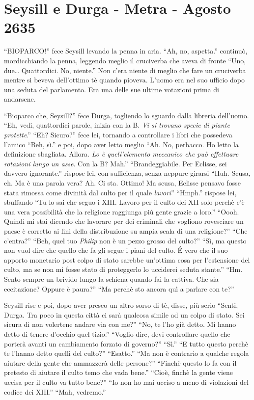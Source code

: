   \section{Seysill e Durga - Metra - Agosto 2635}

    ``BIOPARCO!'' fece Seysill levando la penna in aria. ``Ah, no,
    aspetta.'' continuò, mordicchiando la penna, leggendo meglio il
    cruciverba che aveva di fronte ``Uno, due\dots{} Quattordici. No,
    niente.'' Non c'era niente di meglio che fare un cruciverba mentre si
    beveva dell'ottimo tè quando pioveva. L'uomo era nel suo ufficio dopo
    una seduta del parlamento. Era una delle sue ultime votazioni prima di
    andarsene.

    ``Bioparco che, Seysill?'' fece Durga, togliendo lo sguardo dalla
    libreria dell'uomo. ``Eh, vedi, quattordici parole, inizia con la B.
    \emph{Vi si trovano specie di piante protette}.'' ``Eh? Sicuro?'' fece lei, tornando a
    controllare i libri che possedeva l'amico ``Beh, sì.'' e poi,
    dopo aver letto meglio ``Ah. No, perbacco. Ho letto la definizione
    sbagliata. Allora. \emph{Lo è quell'elemento meccanico che può
    effettuare rotazioni lungo un asse}. Con la B? Mah.'' ``Brandeggiabile.
    Per Eclisse, sei davvero ignorante.'' rispose lei, con sufficienza,
    senza neppure girarsi ``Huh. Scusa, eh. Ma è una parola vera? Ah. Ci
    sta. Ottimo! Ma scusa, Eclisse pensavo fosse stata rimossa come
    divinità dal culto per il quale \emph{lavori}'' ``Hmph.'' rispose lei,
    sbuffando ``Tu lo sai che seguo i XIII. Lavoro per il culto dei XII
    solo perchè c'è una vera possibilità che la religione raggiunga più
    gente grazie a loro.'' ``Oooh. Quindi mi stai dicendo che lavorare per
    dei criminali che vogliono rovesciare un paese è corretto ai fini della
    distribuzione su ampia scala di una religione?'' ``Che c'entra?''
    ``Beh, quel tuo \emph{Philip} non è un pezzo grosso del culto?'' ``Sì,
    ma questo non vuol dire che quello che fa gli segue i piani del
    culto. \'E vero che il suo apporto monetario post colpo di stato
    sarebbe un'ottima cosa per l'estensione del culto, ma se non mi fosse
    stato di proteggerlo lo ucciderei seduta stante.'' ``Hm. Sento sempre
    un brivido lungo la schiena quando fai la cattiva. Che sia eccitazione?
    Oppure è paura?'' ``Ma perchè sto ancora quì a parlare con te?''
    
    Seysill rise e poi, dopo aver preseo un altro sorso di tè, disse, più
    serio ``Senti, Durga. Tra poco in questa città ci sarà qualcosa simile
    ad un colpo di stato. Sei sicura di non volertene andare via con me?''
    ``No, te l'ho già detto. Mi hanno detto di tenere d'occhio quel
    tizio.'' ``Voglio dire, devi controllare quello che porterà avanti un
    cambiamento forzato di governo?'' ``Sì.'' ``E tutto questo perchè te
    l'hanno detto quelli del culto?'' ``Esatto.'' ``Ma non è contrario a
    qualche regola aiutare della gente che ammazzerà delle persone?''
    ``Finchè questo lo fa con il pretesto di aiutare il culto temo che vada
    bene.'' ``Cioè, finchè la gente viene uccisa per il culto va tutto
    bene?'' ``Io non ho mai ucciso a meno di violazioni del codice dei
    XIII.'' ``Mah, vedremo.''

